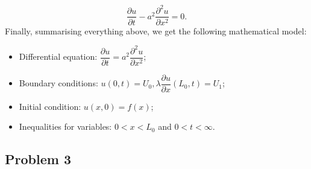 \begin{equation*}
\frac{\partial u}{\partial t} - a^{2}\frac{\partial^{2} u}{\partial x^{2}} = 0.
\end{equation*}
Finally, summarising everything above, we get the following mathematical model:
\begin{itemize}
\item Differential equation: $\dfrac{\partial u}{\partial t} = a^{2}\dfrac{\partial^{2} u}{\partial x^{2}}$;
\item Boundary conditions: $u(0,t)=U_{0}, \lambda \dfrac{\partial u}{\partial x}(L_{0},t)=U_{1}$;
\item Initial condition: $u(x,0)=f(x)$;
\item Inequalities for variables: $0<x<L_{0}$ and $0<t<\infty$.
\end{itemize}

\subsection{Problem 3}

